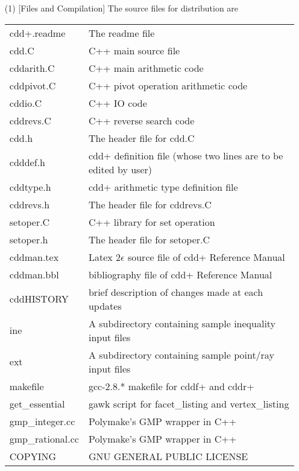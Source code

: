 \documentclass[11pt]{article}
\begin{document}
\begin{itemize}
\item[(1)] [Files and Compilation] The source files for distribution are

\begin{tabular}{ll}
     cdd+.readme  & The readme file\\
     cdd.C       & C++ main source file\\
     cddarith.C  & C++ main arithmetic code\\
     cddpivot.C  & C++ pivot operation arithmetic code\\
     cddio.C     & C++ IO code\\ 
     cddrevs.C   & C++ reverse search code\\ 
     cdd.h       & The header file for cdd.C\\
     cdddef.h    & cdd+ definition file (whose two lines are to be edited by user)\\
     cddtype.h   & cdd+ arithmetic type definition file\\
     cddrevs.h   & The header file for cddrevs.C\\
     setoper.C   & C++ library for set operation\\
     setoper.h   & The header file for setoper.C \\
     cddman.tex  & Latex 2$\epsilon$ source file of cdd+ Reference Manual\\
     cddman.bbl  & bibliography file of cdd+ Reference Manual\\
     cddHISTORY  & brief description of changes made at each updates\\
     ine         & A subdirectory containing sample inequality input  files\\
     ext         & A subdirectory containing sample point/ray input files\\
     makefile    & gcc-2.8.* makefile for cddf+ and cddr+\\
     get\_essential  & gawk script for facet\_listing and vertex\_listing \\
     gmp\_integer.cc  &  Polymake's GMP wrapper in C++\\
     gmp\_rational.cc &  Polymake's GMP wrapper in C++\\
     COPYING     & GNU GENERAL PUBLIC LICENSE\\
\end{tabular}


\end{itemize}
\end{document}
